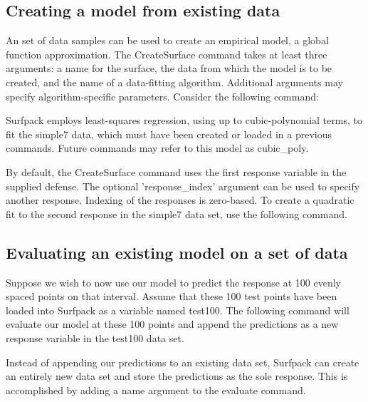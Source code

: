 \documentclass{article}
\begin{document}
\subsection{Creating a model from existing data}\label{sec:create_surface}
An set of data samples can be used to create an empirical model, a global function approximation.  The CreateSurface command takes at least three arguments: a name for the surface, the data from which the model is to be created, and the name of a data-fitting algorithm.  Additional arguments may specify algorithm-specific parameters.  Consider the following command:

Surfpack employs least-squares regression, using up to cubic-polynomial terms, to fit the simple7 data, which must have been created or loaded in a previous commands.  Future commands may refer to this model as cubic\_poly.

By default, the CreateSurface command uses the first response variable in the supplied defense.  The optional 'response\_index' argument can be used to specify another response.  Indexing of the responses is zero-based.  To create a quadratic fit to the second response in the simple7 data set, use the following command.

\subsection{Evaluating an existing model on a set of data}\label{sec:evaluate}
Suppose we wish to now use our model to predict the response at 100 evenly spaced points on that interval.  Assume that these 100 test points have been loaded into Surfpack as a variable named test100.  The following command will evaluate our model at these 100 points and append the predictions as a new response variable in the test100 data set.  

Instead of appending our predictions to an existing data set, Surfpack can create an entirely new data set and store the predictions as the sole response.  This is accomplished by adding a name argument to the evaluate command.

\end{document}

